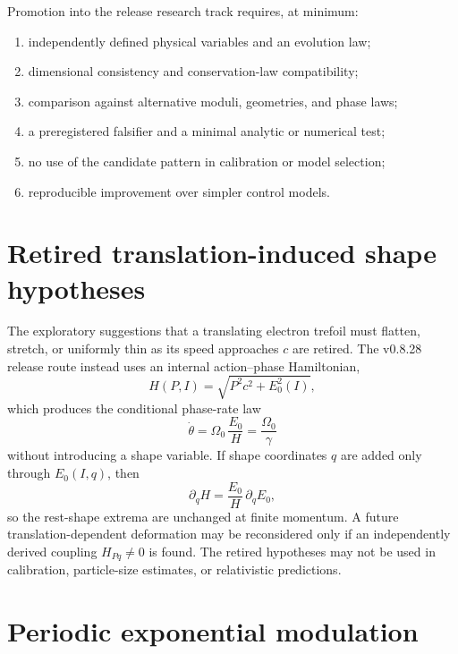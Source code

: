 \documentclass[11pt]{article}
\begin{document}
Promotion into the release research track requires, at minimum:
\begin{enumerate}
    \item independently defined physical variables and an evolution law;
    \item dimensional consistency and conservation-law compatibility;
    \item comparison against alternative moduli, geometries, and phase laws;
    \item a preregistered falsifier and a minimal analytic or numerical test;
    \item no use of the candidate pattern in calibration or model selection;
    \item reproducible improvement over simpler control models.
\end{enumerate}

\section{Retired translation-induced shape hypotheses}

The exploratory suggestions that a translating electron trefoil must flatten,
stretch, or uniformly thin as its speed approaches \(c\) are retired.  The
v0.8.28 release route instead uses an internal action--phase Hamiltonian,
\begin{equation}
    H(P,I)=\sqrt{P^2c^2+E_0^2(I)},
\end{equation}
which produces the conditional phase-rate law
\begin{equation}
    \dot\theta=\Omega_0\,\frac{E_0}{H}=\frac{\Omega_0}{\gamma}
\end{equation}
without introducing a shape variable.  If shape coordinates \(q\) are added
only through \(E_0(I,q)\), then
\begin{equation}
    \partial_qH=\frac{E_0}{H}\,\partial_qE_0,
\end{equation}
so the rest-shape extrema are unchanged at finite momentum.  A future
translation-dependent deformation may be reconsidered only if an independently
derived coupling \(H_{Pq}\neq0\) is found.  The retired hypotheses may not be
used in calibration, particle-size estimates, or relativistic predictions.

\section{Periodic exponential modulation}
\end{document}
